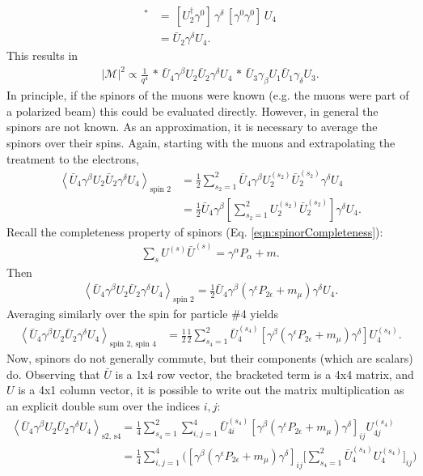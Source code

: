 \begin{align*}
[\bar{U}_4\gamma^\delta U_2]^*&=\,[U^\dagger _2 \gamma^0] \, \gamma^\delta \, [\gamma^0 \gamma^0] \, U_4\\
&=\bar{U}_2 \gamma^\delta U_4.
\end{align*}
This results in
\begin{align} \label{eqn:mottIntermediate}
|\mathcal{M}|^2 \propto \frac{1}{q^4} \, * \, \bar{U}_4\gamma^\beta U_2 \bar{U}_2 \gamma^\delta U_4 \, * \, \bar{U}_3\gamma_\beta U_1 \bar{U}_1 \gamma_\delta U_3.
\end{align}
In principle, if the spinors of the muons were known (e.g. the muons were part of a polarized beam) this could be evaluated directly. However, in general the spinors are not known. As an approximation, it is necessary to average the spinors over their spins. Again, starting with the muons and extrapolating the treatment to the electrons,
\begin{align*}
\left< \bar{U}_4 \gamma^\beta U_2 \bar{U}_2 \gamma^\delta U_4 \right> _\text{spin 2}
&= \frac{1}{2} \sum _{s_2 = 1} ^2 \bar{U}_4 \gamma^\beta U_2 ^{(s_2)} \bar{U}_2 ^{(s_2)} \gamma^\delta U_4\\
&= \frac{1}{2} \bar{U}_4 \gamma^\beta \left[ \sum _{s_2 = 1} ^2 U_2 ^{(s_2)} \bar{U}_2 ^{(s_2)} \right] \gamma^\delta U_4.
\end{align*}
Recall the completeness property of spinors (Eq. \eqref{eqn:spinorCompleteness}):
\begin{align*}
\sum _s U^{(s)}\bar{U}^{(s)} = \gamma^\alpha P_\alpha + m.
\end{align*}
Then
\begin{align*}
\left< \bar{U}_4 \gamma^\beta U_2 \bar{U}_2 \gamma^\delta U_4 \right> _\text{spin 2}
= \frac{1}{2} \bar{U}_4 \gamma^\beta (\gamma^\epsilon P_{2\epsilon}+m_\mu)\gamma^\delta U_4.
\end{align*}
Averaging similarly over the spin for particle \#4 yields
\begin{align*}
\left< \bar{U}_4 \gamma^\beta U_2 \bar{U}_2 \gamma^\delta U_4 \right> _\text{spin 2, spin 4}
&= \frac{1}{2} \frac{1}{2} \sum_{s_4=1} ^2 \bar{U}_4 ^{(s_4)} [\gamma^\beta (\gamma^\epsilon P_{2\epsilon}+m_\mu)\gamma^\delta] U_4 ^{(s_4)}.
\end{align*}
Now, spinors do not generally commute, but their components (which are scalars) do. Observing that $\bar{U}$ is a 1x4 row vector, the bracketed term is a 4x4 matrix, and $U$ is a 4x1 column vector, it is possible to write out the matrix multiplication as an explicit double sum over the indices $i,j$:
\begin{align*}
\left< \bar{U}_4 \gamma^\beta U_2 \bar{U}_2 \gamma^\delta U_4 \right> _\text{s2, s4}
&=\frac{1}{4}\sum_{s_4=1} ^2 \sum_{i,j=1} ^4 \bar{U}_{4i} ^{(s_4)} [\gamma^\beta(\gamma^\epsilon P_{2\epsilon}+m_\mu)\gamma^\delta]_{ij} U_{4j} ^{(s_4)}\\
&=\frac{1}{4}\sum_{i,j=1} ^4 \Big([\gamma^\beta(\gamma^\epsilon P_{2\epsilon}+m_\mu)\gamma^\delta]_{ij} \Big[ \sum_{s_4=1} ^2 \bar{U}_4 ^{(s_4)} U_4 ^{(s_4)}\Big]_{ij} \Big)
\end{align*}

